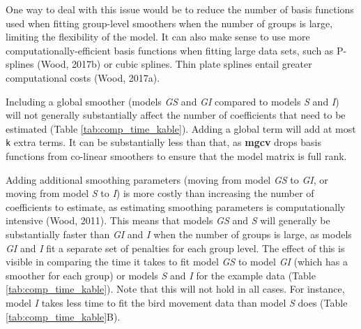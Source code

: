 \documentclass[12pt]{article}
\begin{document}
One way to deal with this issue would be to reduce the number of basis
functions used when fitting group-level smoothers when the number of
groups is large, limiting the flexibility of the model. It can also make
sense to use more computationally-efficient basis functions when fitting
large data sets, such as P-splines (Wood, 2017b) or cubic splines. Thin
plate splines entail greater computational costs (Wood, 2017a).

Including a global smoother (models \emph{GS} and \emph{GI} compared to
models \emph{S} and \emph{I}) will not generally substantially affect
the number of coefficients that need to be estimated (Table
\ref{tab:comp_time_kable}). Adding a global term will add at most
\texttt{k} extra terms. It can be substantially less than that, as
\textbf{mgcv} drops basis functions from co-linear smoothers to ensure
that the model matrix is full rank.

Adding additional smoothing parameters (moving from model \emph{GS} to
\emph{GI}, or moving from model \emph{S} to \emph{I}) is more costly
than increasing the number of coefficients to estimate, as estimating
smoothing parameters is computationally intensive (Wood, 2011). This
means that models \emph{GS} and \emph{S} will generally be substantially
faster than \emph{GI} and \emph{I} when the number of groups is large,
as models \emph{GI} and \emph{I} fit a separate set of penalties for
each group level. The effect of this is visible in comparing the time it
takes to fit model \emph{GS} to model \emph{GI} (which has a smoother
for each group) or models \emph{S} and \emph{I} for the example data
(Table \ref{tab:comp_time_kable}). Note that this will not hold in all
cases. For instance, model \emph{I} takes less time to fit the bird
movement data than model \emph{S} does (Table
\ref{tab:comp_time_kable}B).
\end{document}
